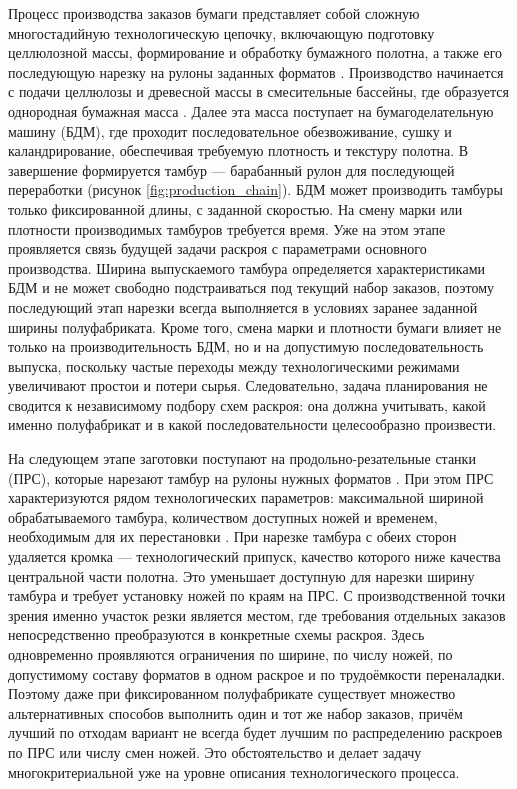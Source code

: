 Процесс производства заказов бумаги представляет собой сложную многостадийную технологическую цепочку, включающую подготовку целлюлозной массы, формирование и обработку бумажного полотна, а также его последующую нарезку на рулоны заданных форматов \cite{hubbe2021_energy}.
Производство начинается с подачи целлюлозы и древесной массы в смесительные бассейны, где образуется однородная бумажная масса \cite{ippta_paper_and_water_2022, kocurek1983_pulp_paper_alkaline}.
Далее эта масса поступает на бумагоделательную машину (БДМ), где проходит последовательное обезвоживание, сушку и каландрирование, обеспечивая требуемую плотность и текстуру полотна.
В завершение формируется тамбур — барабанный рулон для последующей переработки (рисунок \ref{fig:production_chain}).
БДМ может производить тамбуры только фиксированной длины, с заданной скоростью.
На смену марки или плотности производимых тамбуров требуется время.
Уже на этом этапе проявляется связь будущей задачи раскроя с параметрами основного производства. Ширина выпускаемого тамбура определяется характеристиками БДМ и не может свободно подстраиваться под текущий набор заказов, поэтому последующий этап нарезки всегда выполняется в условиях заранее заданной ширины полуфабриката. Кроме того, смена марки и плотности бумаги влияет не только на производительность БДМ, но и на допустимую последовательность выпуска, поскольку частые переходы между технологическими режимами увеличивают простои и потери сырья. Следовательно, задача планирования не сводится к независимому подбору схем раскроя: она должна учитывать, какой именно полуфабрикат и в какой последовательности целесообразно произвести.

На следующем этапе заготовки поступают на продольно-резательные станки (ПРС), которые нарезают тамбур на рулоны нужных форматов \cite{sgp_ccp2021_cutting_stock_modes}.
При этом ПРС характеризуются рядом технологических параметров: максимальной шириной обрабатываемого тамбура, количеством доступных ножей и временем, необходимым для их перестановки \cite{minimizing_waste_multilevel_manufacturing_2025, cyberleninka_slitting_params, martina2022, munawar2005integration}.
При нарезке тамбура с обеих сторон удаляется кромка — технологический припуск, качество которого ниже качества центральной части полотна.
Это уменьшает доступную для нарезки ширину тамбура и требует установку ножей по краям на ПРС.
С производственной точки зрения именно участок резки является местом, где требования отдельных заказов непосредственно преобразуются в конкретные схемы раскроя. Здесь одновременно проявляются ограничения по ширине, по числу ножей, по допустимому составу форматов в одном раскрое и по трудоёмкости переналадки. Поэтому даже при фиксированном полуфабрикате существует множество альтернативных способов выполнить один и тот же набор заказов, причём лучший по отходам вариант не всегда будет лучшим по распределению раскроев по ПРС или числу смен ножей. Это обстоятельство и делает задачу многокритериальной уже на уровне описания технологического процесса.

